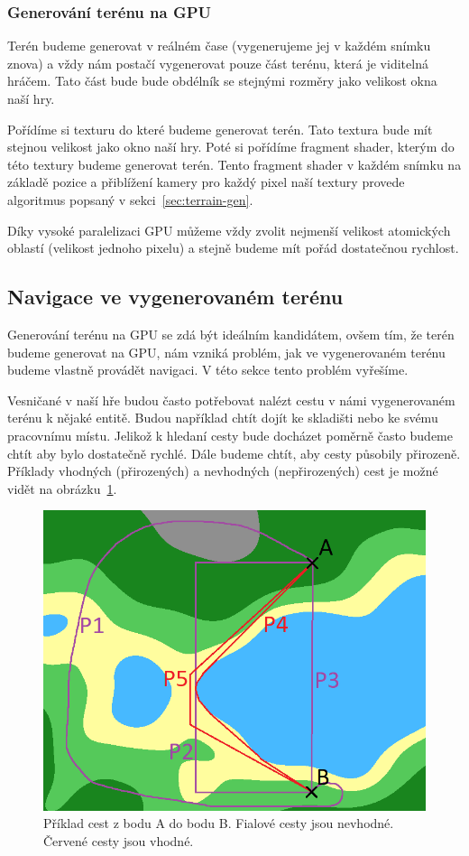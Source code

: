 \subsubsection{Generování terénu na GPU}
Terén budeme generovat v reálném čase (vygenerujeme jej v každém snímku znova) a vždy nám postačí vygenerovat pouze část terénu, která je viditelná hráčem. Tato část bude bude obdélník se stejnými rozměry jako velikost okna naší hry.

Pořídíme si texturu do které budeme generovat terén. Tato textura bude mít stejnou velikost jako okno naší hry. Poté si pořídíme fragment shader, kterým do této textury budeme generovat terén. Tento fragment shader v každém snímku na základě pozice a přiblížení kamery pro každý pixel naší textury provede algoritmus popsaný v sekci~\ref{sec:terrain-gen}.

Díky vysoké paralelizaci GPU můžeme vždy zvolit nejmenší velikost atomických oblastí (velikost jednoho pixelu) a stejně budeme mít pořád dostatečnou rychlost.

\subsection{Navigace ve vygenerovaném terénu}
Generování terénu na GPU se zdá být ideálním kandidátem, ovšem tím, že terén budeme generovat na GPU, nám vzniká problém, jak ve vygenerovaném terénu budeme vlastně provádět navigaci. V této sekce tento problém vyřešíme.

Vesničané v naší hře budou často potřebovat nalézt cestu v námi vygenerovaném terénu k nějaké entitě. Budou například chtít dojít ke skladišti nebo ke svému pracovnímu místu. Jelikož k hledaní cesty bude docházet poměrně často budeme chtít aby bylo dostatečně rychlé. Dále budeme chtít, aby cesty působily přirozeně. Příklady vhodných (přirozených) a nevhodných (nepřirozených) cest je možné vidět na obrázku~\ref{fig:path}.

\begin{figure}[!htb]
    \centering
    \includegraphics[width=0.66\linewidth]{img/path.png}
    \caption{Příklad cest z bodu A do bodu B. Fialové cesty jsou nevhodné. Červené cesty jsou vhodné.}
    \label{fig:path}
\end{figure}

